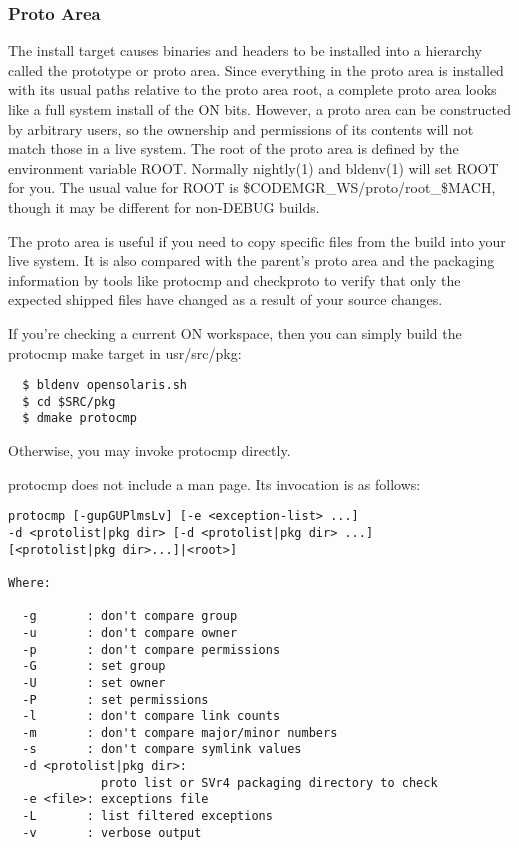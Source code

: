\documentclass{article}
\begin{document}
\subsubsection*{Proto Area}

The install target causes binaries and headers to be installed into a hierarchy
called the prototype or proto area. Since everything in the proto area is
installed with its usual paths relative to the proto area root, a complete
proto area looks like a full system install of the ON bits. However, a proto
area can be constructed by arbitrary users, so the ownership and permissions of
its contents will not match those in a live system. The root of the proto area
is defined by the environment variable ROOT.  Normally nightly(1) and bldenv(1)
will set ROOT for you.  The usual value for ROOT is
\${CODEMGR\_WS}/proto/root\_\${MACH}, though it may be different for non-DEBUG
builds.

The proto area is useful if you need to copy specific files from the build into
your live system. It is also compared with the parent's proto area and the
packaging information by tools like protocmp and checkproto to verify that only
the expected shipped files have changed as a result of your source changes.

If you're checking a current ON workspace, then you can simply build the
protocmp make target in usr/src/pkg:

\begin{verbatim}
  $ bldenv opensolaris.sh
  $ cd $SRC/pkg
  $ dmake protocmp
\end{verbatim}

Otherwise, you may invoke protocmp directly.

protocmp does not include a man page. Its invocation is as follows:

\begin{verbatim}
protocmp [-gupGUPlmsLv] [-e <exception-list> ...]
-d <protolist|pkg dir> [-d <protolist|pkg dir> ...]
[<protolist|pkg dir>...]|<root>]

Where:

  -g       : don't compare group
  -u       : don't compare owner
  -p       : don't compare permissions
  -G       : set group
  -U       : set owner
  -P       : set permissions
  -l       : don't compare link counts
  -m       : don't compare major/minor numbers
  -s       : don't compare symlink values
  -d <protolist|pkg dir>:
             proto list or SVr4 packaging directory to check
  -e <file>: exceptions file
  -L       : list filtered exceptions
  -v       : verbose output

\end{verbatim}
\end{document}
